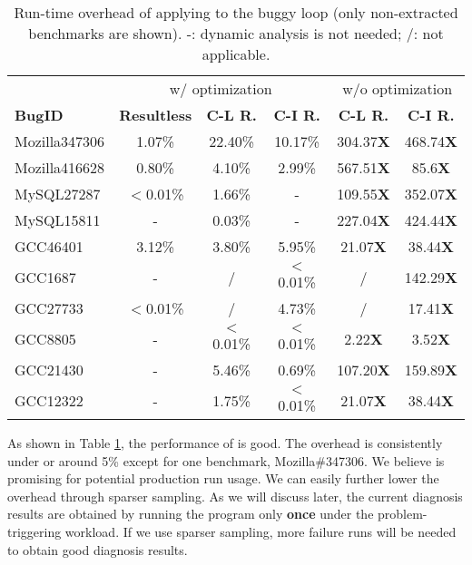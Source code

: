 \begin{table}
  \centering
  \scriptsize
  \newcommand{\Yes}[1]{\checkmark{}$_#1$}
  \newcommand{\No}[0]{-}
  \begin{tabular}{lccccc}
    \toprule
	    & \multicolumn{3}{c}{\Tool w/ optimization} & \multicolumn{2}{c}{w/o optimization} \\
     \cmidrule(lr){2-4}
     \cmidrule(lr){5-6}
     {\bf BugID}  & {\bf Resultless}  &  {\bf C-L R. } & {\bf C-I R. }  & {\bf C-L R.}  & {\bf C-I R. } \\
    \midrule
    Mozilla347306 &  1.07\%           &  22.40\%       &  10.17\%       & 304.37{\bf X} & 468.74{\bf X} \\ 
    Mozilla416628 &  0.80\%           &  4.10\%        &  2.99\%        & 567.51{\bf X} & 85.6{\bf X} \\
    \midrule
     MySQL27287   & $<$0.01\%           &   1.66\%       &   -            & 109.55{\bf X} & 352.07{\bf X} \\
     MySQL15811   &  -                &   0.03\%       &   -            & 227.04{\bf X} & 424.44{\bf X} \\
    \midrule
      GCC46401    & 3.12\%         & 3.80\%            &  5.95\%        & 21.07{\bf X}  & 38.44{\bf X}\\ 
      GCC1687     & -              & /                 &  $<$0.01\%       &   /           & 142.29{\bf X} \\
      GCC27733    & $<$0.01\%        & /                 &  4.73\%        &   /           & 17.41{\bf X}     \\
      GCC8805     & -              & $<$0.01\%           & $<$0.01\%        & 2.22{\bf X}   &  3.52{\bf X}\\
      GCC21430    & -              & 5.46\%            &   0.69\%       & 107.20{\bf X} & 159.89{\bf X} \\
      GCC12322    & -              & 1.75\%            &  $<$0.01\%       & 21.07{\bf X}  & 38.44{\bf X} \\
   \bottomrule
   \end{tabular}
  \caption{Run-time overhead of applying \Tool to the buggy loop
    (only non-extracted benchmarks are shown). 
  -: dynamic analysis is not needed;
  /: not applicable.}
  \label{tab:performance}
\end{table}


As shown in Table \ref{tab:performance}, 
the performance of \Tool is good. The overhead is consistently under or around 5\% 
except for one benchmark, Mozilla\#347306. We believe \Tool is promising for potential production
run usage.
We can easily further lower the overhead through sparser sampling.
As we will discuss later, 
the current diagnosis results are obtained by running the
program only \textbf{once} under the problem-triggering workload.
If we use sparser sampling, more failure runs will be needed to obtain good
diagnosis results.

